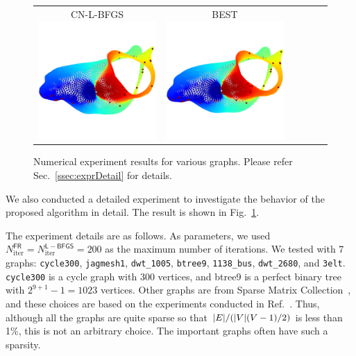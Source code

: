 \documentclass[dvipdfmx,10pt,journal,compsoc]{IEEEtran}
\begin{document}
\begin{figure}[btp]
\begin{tabular}{cccccc}
    \makecell{\small{\textsf{CN-L-BFGS}}                                                                                                                 \\[-0.2em]\includegraphics[width=0.27\columnwidth]{individual/vis/3elt_CN-L-BFGS.png}} &
    \makecell{\small{\textsf{BEST}}                                                                                                                      \\[-0.2em]\includegraphics[width=0.27\columnwidth]{individual/vis/opt_3elt.png}} \\
  \end{tabular}
  \caption{Numerical experiment results for various graphs.  Please refer Sec.~\ref{ssec:exprDetail} for details.}
  \label{fig:individual}
\end{figure}

We also conducted a detailed experiment to investigate the behavior of the proposed algorithm in detail. The result is shown in Fig.~\ref{fig:individual}.

The experiment details are as follows.
As parameters, we used $N_\mathrm{iter}^\mathsf{FR} = N_\mathrm{iter}^\mathsf{L-BFGS} = 200$ as the maximum number of iterations.
We tested with 7 graphs: \texttt{cycle300}, \texttt{jagmesh1}, \texttt{dwt\_1005}, \texttt{btree9}, \texttt{1138\_bus}, \texttt{dwt\_2680}, and \texttt{3elt}. \texttt{cycle300} is a cycle graph with 300 vertices, and btree9 is a perfect binary tree with $2^{9+1}-1=1023$ vertices. Other graphs are from Sparse Matrix Collection~\cite{davis2011university}, and these choices are based on the experiments conducted in Ref.~\cite{8419285}. Thus, although all the graphs are quite sparse so that $\abs{E} / (\abs{V}(V-1)/2)$ is less than 1\%, this is not an arbitrary choice. The important graphs often have such a sparsity.
\end{document}
